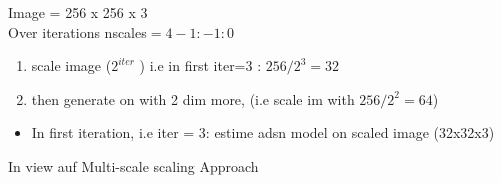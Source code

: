\documentclass[
     12pt,         %
     a4paper,      %
     BCOR=10mm,     %
     DIV=14,        %
     ]{scrreprt}
\begin{document}
%
%
%

Image = 256 x 256 x 3 \\
Over iterations nscales$=4-1 : -1 : 0$
\begin{enumerate}
    \item scale image ($2^{iter}$ ) i.e in first iter=3 : $256 / 2^3 =32$
    \item then generate on with 2 dim more, (i.e scale im with  $256 / 2^2 = 64 $)
\end{enumerate}
\begin{itemize}
    \item In first iteration, i.e iter = 3: estime adsn model on scaled image (32x32x3)
\end{itemize}

In view auf Multi-scale scaling Approach

\end{document}
